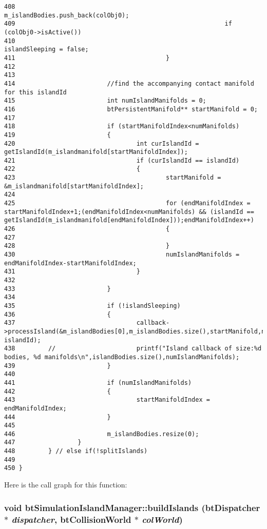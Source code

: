 \begin{Code}
\begin{verbatim}
408                                                         m_islandBodies.push_back(colObj0);
409                                                         if (colObj0->isActive())
410                                                                         islandSleeping = false;
411                                         }
412                         
413 
414                         //find the accompanying contact manifold for this islandId
415                         int numIslandManifolds = 0;
416                         btPersistentManifold** startManifold = 0;
417 
418                         if (startManifoldIndex<numManifolds)
419                         {
420                                 int curIslandId = getIslandId(m_islandmanifold[startManifoldIndex]);
421                                 if (curIslandId == islandId)
422                                 {
423                                         startManifold = &m_islandmanifold[startManifoldIndex];
424                                 
425                                         for (endManifoldIndex = startManifoldIndex+1;(endManifoldIndex<numManifolds) && (islandId == getIslandId(m_islandmanifold[endManifoldIndex]));endManifoldIndex++)
426                                         {
427 
428                                         }
430                                         numIslandManifolds = endManifoldIndex-startManifoldIndex;
431                                 }
432 
433                         }
434 
435                         if (!islandSleeping)
436                         {
437                                 callback->processIsland(&m_islandBodies[0],m_islandBodies.size(),startManifold,numIslandManifolds, islandId);
438         //                      printf("Island callback of size:%d bodies, %d manifolds\n",islandBodies.size(),numIslandManifolds);
439                         }
440                         
441                         if (numIslandManifolds)
442                         {
443                                 startManifoldIndex = endManifoldIndex;
444                         }
445 
446                         m_islandBodies.resize(0);
447                 }
448         } // else if(!splitIslands) 
449 
450 }
\end{verbatim}
\end{Code}




Here is the call graph for this function:\hypertarget{classbt_simulation_island_manager_ea0b5869eca2d034ac9c643e149a5e01}{
\subsubsection[buildIslands]{\setlength{\rightskip}{0pt plus 5cm}void btSimulationIslandManager::buildIslands ({\bf btDispatcher} $\ast$ {\em dispatcher}, \/  {\bf btCollisionWorld} $\ast$ {\em colWorld})}}
\label{classbt_simulation_island_manager_ea0b5869eca2d034ac9c643e149a5e01}




